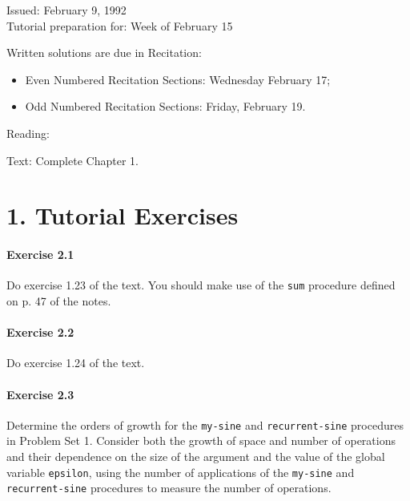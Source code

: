

 
 \def\fbox#1{%
  \vtop{\vbox{\hrule%
     \hbox{\vrule\kern3pt%
 \vtop{\vbox{\kern3pt#1}\kern3pt}%
 \kern3pt\vrule}}%
 \hrule}}




\medskip

\begin{flushleft}
Issued:  February 9, 1992 \\
\smallskip
Tutorial preparation for: Week of February 15 \\
\smallskip

Written solutions are due in Recitation: 
\begin{itemize}
\item Even Numbered Recitation Sections: Wednesday February 17; 
\item Odd Numbered Recitation Sections: Friday, February 19.
\end{itemize}

\smallskip


Reading: 
\begin{tightlist}

\item Text: Complete Chapter 1.

\end{tightlist}
\end{flushleft}

\section{1. Tutorial Exercises}

\paragraph{Exercise 2.1}
Do exercise 1.23 of the text. You should make use of the
{\tt sum} procedure defined on p. 47 of the notes.

\paragraph{Exercise 2.2}
Do exercise 1.24 of the text. 

\paragraph{Exercise 2.3}
Determine the orders of growth for the {\tt my-sine}
and {\tt recurrent-sine} procedures in Problem Set 1. 
Consider both the growth
of space and number of operations and their dependence on the 
size of the argument and the value of the global variable {\tt epsilon},
using the number of 
applications of the {\tt my-sine} and {\tt recurrent-sine} 
procedures to measure the number of operations.

